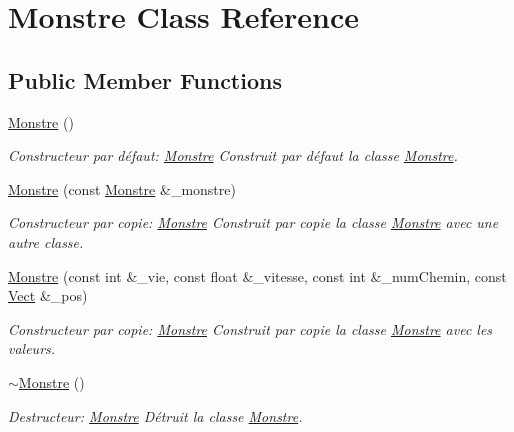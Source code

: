 \hypertarget{classMonstre}{}\section{Monstre Class Reference}
\label{classMonstre}
\subsection*{Public Member Functions}
\begin{DoxyCompactItemize}
\item 
\hyperlink{classMonstre_a8efe47ee8ea4b5ee8e5d3820e620059b}{Monstre} ()
\begin{DoxyCompactList}\small\item\em Constructeur par défaut\+: \hyperlink{classMonstre}{Monstre} Construit par défaut la classe \hyperlink{classMonstre}{Monstre}. \end{DoxyCompactList}\item 
\hyperlink{classMonstre_a9097846a3f136f6db0a51b80a3ccc15d}{Monstre} (const \hyperlink{classMonstre}{Monstre} \&\+\_\+monstre)
\begin{DoxyCompactList}\small\item\em Constructeur par copie\+: \hyperlink{classMonstre}{Monstre} Construit par copie la classe \hyperlink{classMonstre}{Monstre} avec une autre classe. \end{DoxyCompactList}\item 
\hyperlink{classMonstre_aa413ee7bcdcd31bcf5957110c0d31b8a}{Monstre} (const int \&\+\_\+vie, const float \&\+\_\+vitesse, const int \&\+\_\+num\+Chemin, const \hyperlink{classVect}{Vect} \&\+\_\+pos)
\begin{DoxyCompactList}\small\item\em Constructeur par copie\+: \hyperlink{classMonstre}{Monstre} Construit par copie la classe \hyperlink{classMonstre}{Monstre} avec les valeurs. \end{DoxyCompactList}\item 
\mbox{\label{classMonstre_a8e736b63ae1f561904dad7767448156e}} 
\hyperlink{classMonstre_a8e736b63ae1f561904dad7767448156e}{$\sim$\+Monstre} ()
\begin{DoxyCompactList}\small\item\em Destructeur\+: \hyperlink{classMonstre}{Monstre} Détruit la classe \hyperlink{classMonstre}{Monstre}. \end{DoxyCompactList}\item 

\end{DoxyCompactItemize}
